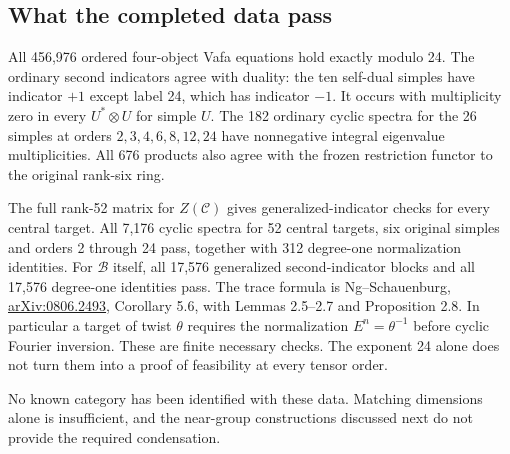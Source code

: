 \subsection{What the completed data pass}

All 456,976 ordered four-object Vafa equations hold exactly modulo 24.
The ordinary second indicators agree with duality: the ten self-dual
simples have indicator $+1$ except label 24, which has indicator $-1$.
It occurs with multiplicity zero in every $U^*\otimes U$ for simple
$U$. The 182 ordinary cyclic spectra for the 26 simples at orders
$2,3,4,6,8,12,24$ have nonnegative integral eigenvalue multiplicities.
All 676 products also agree with the frozen restriction functor to
the original rank-six ring.

The full rank-52 matrix for $Z(\mathcal C)$ gives generalized-indicator
checks for every central target. All 7,176 cyclic spectra for
52 central targets, six original simples and orders 2 through 24
pass, together with 312 degree-one normalization identities.
For $\mathcal B$ itself, all 17,576 generalized second-indicator blocks
and all 17,576 degree-one identities pass.
The trace formula is Ng--Schauenburg,
\href{https://arxiv.org/abs/0806.2493}{arXiv:0806.2493},
Corollary 5.6, with Lemmas 2.5--2.7 and Proposition 2.8.
In particular a target of twist $\theta$ requires the normalization
$E^n=\theta^{-1}$ before cyclic Fourier inversion.
These are finite necessary checks. The exponent 24 alone does not
turn them into a proof of feasibility at every tensor order.

No known category has been identified with these data. Matching
dimensions alone is insufficient, and the near-group constructions
discussed next do not provide the required condensation.

